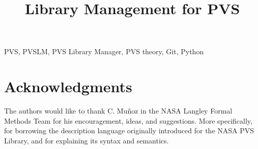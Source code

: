 \documentclass[fleqn,conference]{IEEEtran}
\begin{document}

\title{Library Management for PVS}

\author{
}


\maketitle



\begin{IEEEkeywords}
PVS, PVSLM, PVS Library Manager, PVS theory, Git, Python
\end{IEEEkeywords}














\section*{Acknowledgments}
The authors would like to thank C. Mu\~noz in the NASA Langley Formal
Methods Team for his encouragement, ideas, and suggestions. More
specifically, for borrowing the description language originally
introduced for the NASA PVS Library, and for explaining its syntax and
semantics.



\end{document}
